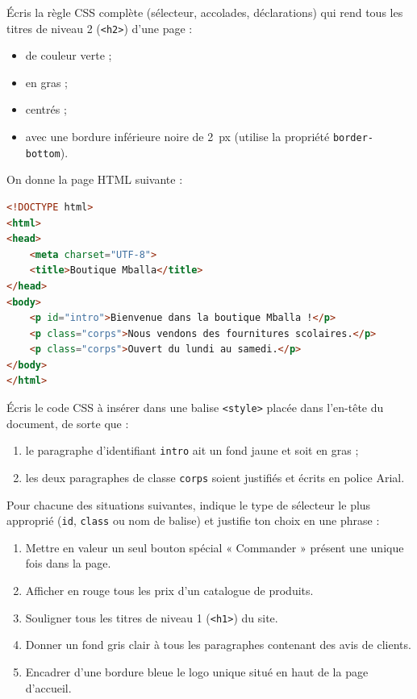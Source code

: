 \documentclass[11pt]{article}
\newcommand{\cle}[1]{{\popxbold\color{popdark}#1}}
\newcounter{popsec}
\newcounter{popsub}
\newcommand{\courssub}[1]{%
  \stepcounter{popsub}%
  \par\vspace{9pt}\noindent{\popxbold\fontsize{11.5}{13}\selectfont\color{popink}{\color{poporange}\thepopsec.\thepopsub}\hspace{6pt}#1}\par\nopagebreak\vspace{4pt}
}
\begin{document}
\courssub{Je m'entraîne}

\begin{exercice}
Écris la règle \cle{CSS} complète (sélecteur, accolades, déclarations) qui rend tous les titres de niveau 2 (\texttt{<h2>}) d'une page :
\begin{itemize}
  \item de couleur verte ;
  \item en gras ;
  \item centrés ;
  \item avec une bordure inférieure noire de \SI{2}{px} (utilise la propriété \texttt{border-bottom}).
\end{itemize}
\end{exercice}

\begin{exercice}
On donne la page \cle{HTML} suivante :
\begin{lstlisting}[language=HTML]
<!DOCTYPE html>
<html>
<head>
    <meta charset="UTF-8">
    <title>Boutique Mballa</title>
</head>
<body>
    <p id="intro">Bienvenue dans la boutique Mballa !</p>
    <p class="corps">Nous vendons des fournitures scolaires.</p>
    <p class="corps">Ouvert du lundi au samedi.</p>
</body>
</html>
\end{lstlisting}
Écris le code \cle{CSS} à insérer dans une balise \texttt{<style>} placée dans l'en-tête du document, de sorte que :
\begin{enumerate}
  \item le paragraphe d'identifiant \texttt{intro} ait un fond jaune et soit en gras ;
  \item les deux paragraphes de classe \texttt{corps} soient justifiés et écrits en police Arial.
\end{enumerate}
\end{exercice}

\begin{exercice}
Pour chacune des situations suivantes, indique le type de sélecteur le plus approprié (\texttt{id}, \texttt{class} ou nom de balise) et justifie ton choix en une phrase :
\begin{enumerate}
  \item Mettre en valeur un seul bouton spécial « Commander » présent une unique fois dans la page.
  \item Afficher en rouge tous les prix d'un catalogue de produits.
  \item Souligner tous les titres de niveau 1 (\texttt{<h1>}) du site.
  \item Donner un fond gris clair à tous les paragraphes contenant des avis de clients.
  \item Encadrer d'une bordure bleue le logo unique situé en haut de la page d'accueil.
\end{enumerate}
\end{exercice}
\end{document}
